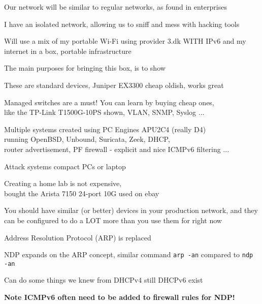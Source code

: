 \documentclass[Screen16to9,17pt]{foils}
\newcommand{\myalert}{\color{red}\faFlag}
\begin{document}


\begin{list1}
\item Our network will be similar to regular networks, as found in enterprises
\item I have an isolated network, allowing us to sniff and mess with hacking tools
\item Will use a mix of my portable Wi-Fi using provider 3.dk WITH IPv6 and my internet in a box, portable infrastructure
\end{list1}



The main purposes for bringing this box, is to show
\begin{list2}
\item These are standard devices, Juniper EX3300 cheap oldish, works great
\item Managed switches are a must! You can learn by buying cheap ones,\\
like the TP-Link T1500G-10PS  shown, VLAN, SNMP, Syslog ...
\item Multiple systems created using PC Engines APU2C4 (really D4)\\
running OpenBSD, Unbound, Suricata, Zeek, DHCP, \\
router advertisement, PF firewall - explicit and nice ICMPv6 filtering ...
\item Attack systems compact PCs or laptop
\item Creating a home lab is not expensive, \\
bought the Arista 7150 24-port 10G used on ebay
\end{list2}

You should have similar (or better) devices in your production network, and they can be
configured to do a LOT more than you use them for right now




\begin{list1}
\item Address Resolution Protocol (ARP) is replaced
\item NDP expands on the ARP concept, similar command \verb+arp -an+ compared to \verb+ndp -an+
\item Can do some things we knew from DHCPv4 still DHCPv6 exist
\item {\bf Note ICMPv6 often need to be added to firewall rules for NDP!} {\myalert}
\end{list1}
\end{document}
